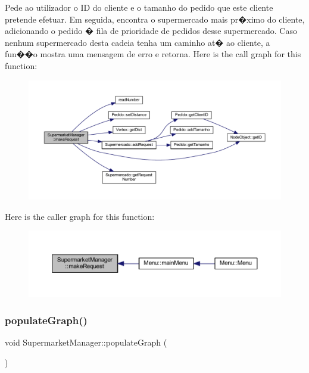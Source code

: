 Pede ao utilizador o ID do cliente e o tamanho do pedido que este cliente pretende efetuar. Em seguida, encontra o supermercado mais pr�ximo do cliente, adicionando o pedido � fila de prioridade de pedidos desse supermercado. Caso nenhum supermercado desta cadeia tenha um caminho at� ao cliente, a fun��o mostra uma mensagem de erro e retorna. Here is the call graph for this function\+:
\nopagebreak
\begin{figure}[H]
\begin{center}
\leavevmode
\includegraphics[width=350pt]{class_supermarket_manager_a19901c8d338b7579398373aeda62ecf2_cgraph}
\end{center}
\end{figure}
Here is the caller graph for this function\+:
\nopagebreak
\begin{figure}[H]
\begin{center}
\leavevmode
\includegraphics[width=350pt]{class_supermarket_manager_a19901c8d338b7579398373aeda62ecf2_icgraph}
\end{center}
\end{figure}
\mbox{\label{class_supermarket_manager_a882d9161a59b259f5b0f62c230c11db9}} 
\subsubsection{\texorpdfstring{populate\+Graph()}{populateGraph()}}
{\footnotesize\ttfamily void Supermarket\+Manager\+::populate\+Graph (\begin{DoxyParamCaption}{ }\end{DoxyParamCaption})}

